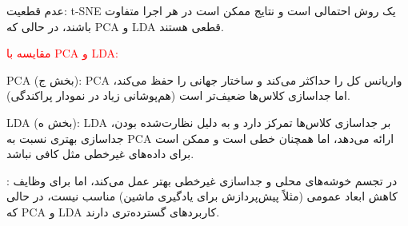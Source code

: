 \documentclass{article}
\begin{document}
عدم قطعیت: t-SNE یک روش احتمالی است و نتایج ممکن است در هر اجرا متفاوت باشند، در حالی که PCA و LDA قطعی هستند.

\textcolor{red}{مقایسه با PCA و LDA:}

PCA (بخش ج): PCA واریانس کل را حداکثر می‌کند و ساختار جهانی را حفظ می‌کند، اما جداسازی کلاس‌ها ضعیف‌تر است (هم‌پوشانی زیاد در نمودار پراکندگی).

LDA (بخش ه): LDA بر جداسازی کلاس‌ها تمرکز دارد و به دلیل نظارت‌شده بودن، جداسازی بهتری نسبت به PCA ارائه می‌دهد، اما همچنان خطی است و ممکن است برای داده‌های غیرخطی مثل  کافی نباشد.

: در تجسم خوشه‌های محلی و جداسازی غیرخطی بهتر عمل می‌کند، اما برای وظایف کاهش ابعاد عمومی (مثلاً پیش‌پردازش برای یادگیری ماشین) مناسب نیست، در حالی که PCA و LDA کاربردهای گسترده‌تری دارند.
\end{document}
